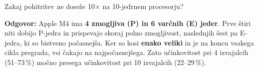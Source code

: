 \documentclass[12pt,a4paper]{article}
\begin{document}
\begin{vprasanje}
Zakaj pohitritev ne dose\v{z}e 10$\times$ na 10-jedrnem procesorju?

\textbf{Odgovor:} Apple M4 ima \textbf{4 zmogljiva (P) in 6 var\v{c}nih (E) jeder}. Prve \v{s}tiri niti dobijo P-jedra in prispevajo skoraj polno zmogljivost, naslednjih \v{s}est pa E-jedra, ki so bistveno po\v{c}asnej\v{s}a. Ker so kosi \textbf{enako veliki} in je na koncu vsakega cikla pregrada, vsi \v{c}akajo na najpo\v{c}asnej\v{s}ega. Zato u\v{c}inkovitost pri 4 izvajalcih (51--73\,\%) mo\v{c}no presega u\v{c}inkovitost pri 10 izvajalcih (22--29\,\%).
\end{vprasanje}
\end{document}

